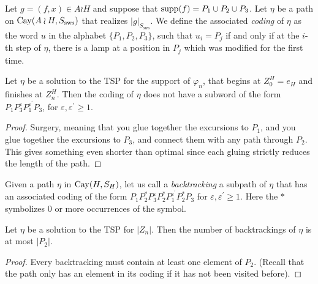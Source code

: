 \begin{defin}
	 Let $g=(f,x)\in A\wr H$ and suppose that $\mathrm{supp}(f)=P_1\cup P_2\cup P_3$. Let $\eta$ be a path on $\mathrm{Cay}(A\wr H,S_{\mathrm{sws}})$ that realizes $|g|_{S_{\mathrm{sws}}}$. We define the associated \emph{coding} of $\eta$ as the word $u$ in the alphabet $\{P_1,P_2,P_3\}$, such that $u_i=P_j$ if and only if at the $i$-th step of $\eta$, there is a lamp at a position in $P_j$ which was modified for the first time.
\end{defin}

\begin{lem}\label{lem: groceries lemma p1p3p1p3}
	Let $\eta$ be a solution to the TSP for the support of $\varphi_n$, that begins at $Z_0^H=e_H$ and finishes at $Z_n^H$. Then the coding of $\eta$ does not have a subword of the form $P_1P_3^{\varepsilon}P_1^{\varepsilon^{\prime }}P_3$, for $\varepsilon, \varepsilon^{\prime}\ge 1$.
\end{lem}
\begin{proof}
	Surgery, meaning that you glue together the excursions to $P_1$, and you glue together the excursions to $P_3$, and connect them with any path through $P_2$. This gives something even shorter than optimal since each gluing strictly reduces the length of the path.
\end{proof}
\begin{defin}
	Given a path $\eta$ in $\mathrm{Cay}(H,S_H)$, let us call a \emph{backtracking} a subpath of $\eta$ that has an associated coding of the form $P_1P_2^{*}P_3^{\varepsilon}P_2^{*}P_1^{\varepsilon^{\prime}}P_2^{*}P_3$ for $\varepsilon, \varepsilon^{\prime}\ge 1$. Here the $*$ symbolizes $0$ or more occurrences of the symbol.
\end{defin}


\begin{cor}\label{cor: number of backtrackings}
	Let $\eta$ be a solution to the TSP for $|Z_n|$. Then the number of backtrackings of $\eta$ is at most $|P_2|$.
\end{cor}
\begin{proof}
	Every backtracking must contain at least one element of $P_2$. (Recall that the path only has an element in its coding if it has not been visited before).
\end{proof}

